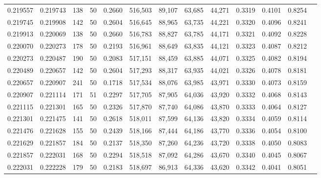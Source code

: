 \begin{tabular}{rrrrrrrrrrrrr}
0.219557 & 0.219743 &   138 &  50 &                                     0.2660 & 516,503 &  89,107 &  63,685 &  44,271 & 0.3319 & 0.4101 & 0.8254 \\
0.219745 & 0.219908 &   142 &  50 &                                     0.2604 & 516,645 &  88,965 &  63,735 &  44,221 & 0.3320 & 0.4096 & 0.8241 \\
0.219913 & 0.220069 &   138 &  50 &                                     0.2660 & 516,783 &  88,827 &  63,785 &  44,171 & 0.3321 & 0.4092 & 0.8228 \\
0.220070 & 0.220273 &   178 &  50 &                                     0.2193 & 516,961 &  88,649 &  63,835 &  44,121 & 0.3323 & 0.4087 & 0.8212 \\
0.220273 & 0.220487 &   190 &  50 &                                     0.2083 & 517,151 &  88,459 &  63,885 &  44,071 & 0.3325 & 0.4082 & 0.8194 \\
0.220489 & 0.220657 &   142 &  50 &                                     0.2604 & 517,293 &  88,317 &  63,935 &  44,021 & 0.3326 & 0.4078 & 0.8181 \\
0.220657 & 0.220907 &   241 &  50 &                                     0.1718 & 517,534 &  88,076 &  63,985 &  43,971 & 0.3330 & 0.4073 & 0.8159 \\
0.220907 & 0.221114 &   171 &  51 &                                     0.2297 & 517,705 &  87,905 &  64,036 &  43,920 & 0.3332 & 0.4068 & 0.8143 \\
0.221115 & 0.221301 &   165 &  50 &                                     0.2326 & 517,870 &  87,740 &  64,086 &  43,870 & 0.3333 & 0.4064 & 0.8127 \\
0.221301 & 0.221475 &   141 &  50 &                                     0.2618 & 518,011 &  87,599 &  64,136 &  43,820 & 0.3334 & 0.4059 & 0.8114 \\
0.221476 & 0.221628 &   155 &  50 &                                     0.2439 & 518,166 &  87,444 &  64,186 &  43,770 & 0.3336 & 0.4054 & 0.8100 \\
0.221629 & 0.221857 &   184 &  50 &                                     0.2137 & 518,350 &  87,260 &  64,236 &  43,720 & 0.3338 & 0.4050 & 0.8083 \\
0.221857 & 0.222031 &   168 &  50 &                                     0.2294 & 518,518 &  87,092 &  64,286 &  43,670 & 0.3340 & 0.4045 & 0.8067 \\
0.222031 & 0.222228 &   179 &  50 &                                     0.2183 & 518,697 &  86,913 &  64,336 &  43,620 & 0.3342 & 0.4041 & 0.8051 \\

\end{tabular}
